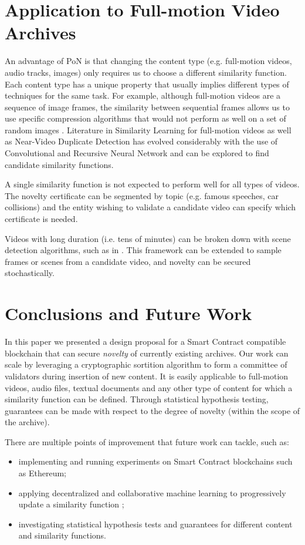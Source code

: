 \documentclass[conference]{IEEEtran}
\begin{document}
\section{Application to Full-motion Video Archives}
An advantage of PoN is that changing the content type (e.g. full-motion videos, audio tracks, images) only requires us to choose a different similarity function. Each content type has a unique property that usually implies different types of techniques for the same task. For example, although full-motion videos are a sequence of image frames, the similarity between sequential frames allows us to use specific compression algorithms that would not perform as well on a set of random images \cite{le1991mpeg}. Literature in Similarity Learning for full-motion videos as well as Near-Video Duplicate Detection \cite{li2019fast} has evolved considerably with the use of Convolutional and Recursive Neural Network \cite{saadatpanah2019adversarial} and can be explored to find candidate similarity functions.

A single similarity function is not expected to perform well for all types of videos. The novelty certificate can be segmented by topic (e.g. famous speeches, car collisions) and the entity wishing to validate a candidate video can specify which certificate is needed. 

Videos with long duration (i.e. tens of minutes) can be broken down with scene detection algorithms, such as in \cite{bui2019archangel}. This framework can be extended to sample frames or scenes from a candidate video, and novelty can be secured stochastically.

\section{Conclusions and Future Work}
In this paper we presented a design proposal for a Smart Contract compatible blockchain that can secure \emph{novelty} of currently existing archives. Our work can scale by leveraging a cryptographic sortition algorithm to form a committee of validators during insertion of new content. It is easily applicable to full-motion videos, audio files, textual documents and any other type of content for which a similarity function can be defined. Through statistical hypothesis testing, guarantees can be made with respect to the degree of novelty (within the scope of the archive).

There are multiple points of improvement that future work can tackle, such as:
\begin{itemize}
    \item implementing and running experiments on Smart Contract blockchains such as Ethereum;
    \item applying decentralized and collaborative machine learning to progressively update a similarity function \cite{harris2019decentralized};
    \item investigating statistical hypothesis tests and guarantees for different content and similarity functions.
\end{itemize}
\end{document}

